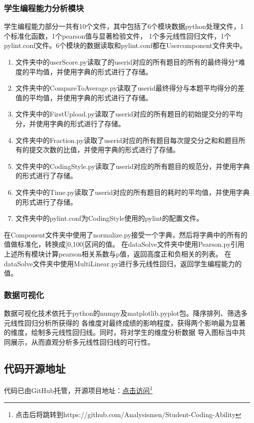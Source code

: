 \documentclass[UTF8]{ctexart}
\begin{document}
\subsubsection{学生编程能力分析模块}

学生编程能力部分一共有10个文件，其中包括了6个模块数据python处理文件，1个标准化函数，1个pearson值与显著检验文件，
1个多元线性回归文件，1个pylint.conf文件。6个模块的数据读取和pylint.conf都在Usercomponent文件夹中。

\begin{enumerate}[(1)]

    \item 文件夹中的userScore.py读取了的userid对应的所有题目的所有的最终得分*难度的平均值，并使用字典的形式进行了存储。
    \item 文件夹中的CompareToAverage.py读取了userid最终得分与本题平均得分的差值的平均值，并使用字典的形式进行了存储。
    \item 文件夹中的FirstUpload.py读取了userid对应的所有题目的初始提交分的平均分，并使用字典的形式进行了存储。
    \item 文件夹中的Fraction.py读取了userid对应的所有题目每次提交分之和和题目所有的提交次数的比值，并使用字典的形式进行了存储。
    \item 文件夹中的CodingStyle.py读取了userid对应的所有题目的规范分，并使用字典的形式进行了存储。
    \item 文件夹中的Time.py读取了userid对应的所有题目的耗时的平均值，并使用字典的形式进行了存储。
    \item 文件夹中的pylint.conf为CodingStyle使用的pylint的配置文件。

\end{enumerate}

在Component文件夹中使用了normalize.py接受一个字典，然后将字典中的所有的值做标准化，转换成[0,100]区间的值。
在dataSolve文件夹中使用Pearson.py引用上述所有模块计算pearson相关系数与p值，返回高度正和负相关的列表。
在dataSolve文件夹中使用MultiLinear.py进行多元线性回归，返回学生编程能力的值。
\subsubsection{数据可视化}
数据可视化技术依托于python的numpy及matplotlib.pyplot包。降序排列、筛选多元线性回归分析所获得的
各维度对最终成绩的影响程度，获得两个影响最为显著的维度，绘制多元线性回归线。同时，将对学生的维度分析数据
导入图标当中共同展示，从而直观分析多元线性回归线的可行性。
\subsection{代码开源地址}
代码已由GitHub托管，开源项目地址：\href{https://github.com/Analysismen/Student-Coding-Ability}{点击访问}\footnote{点击后将跳转到https://github.com/Analysismen/Student-Coding-Ability}
\end{document}
